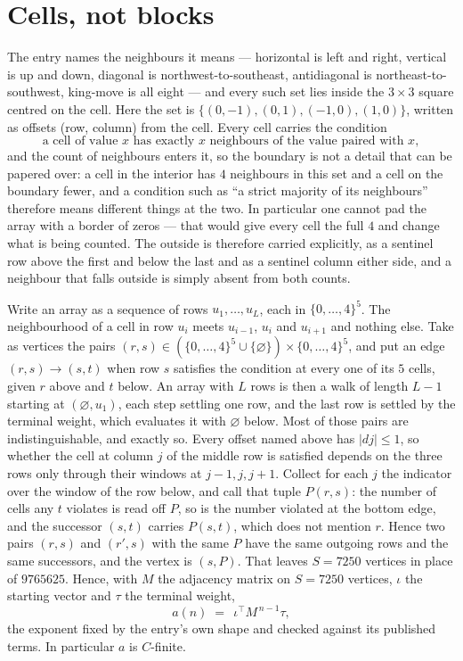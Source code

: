 \documentclass[11pt,a4paper]{article}
\theoremstyle{plain}
\theoremstyle{definition}
\begin{document}
\section{Cells, not blocks}

The entry names the neighbours it means --- horizontal is left and right, vertical is up and
down, diagonal is northwest-to-southeast, antidiagonal is northeast-to-southwest, king-move is
all eight --- and every such set lies inside the $3\times3$ square centred on the cell. Here
the set is $\{(0,-1), (0,1), (-1,0), (1,0)\}$, written as offsets (row, column) from the cell. Every cell carries
the condition
\[
\text{a cell of value }x\text{ has exactly }x\text{ neighbours of the value paired with }x,
\]
and the count of neighbours enters it, so the boundary is not a detail that can be papered
over: a cell in the interior has $4$ neighbours in this set and a cell on the boundary
fewer, and a condition such as ``a strict majority of its neighbours'' therefore means
different things at the two. In particular one cannot pad the array with a border of zeros ---
that would give every cell the full $4$ and change what is being counted. The outside is
therefore carried
explicitly, as a sentinel row above the first and below the last and as a sentinel column
either side, and a neighbour that falls outside is simply absent from both counts.

Write an array as a sequence of rows $u_1,\dots,u_L$, each in
$\{0,\dots,4\}^{5}$. The neighbourhood of a cell in row $u_i$ meets $u_{i-1}$,
$u_i$ and $u_{i+1}$ and nothing else. Take as vertices the pairs
$(r,s)\in(\{0,\dots,4\}^{5}\cup\{\varnothing\})\times\{0,\dots,4\}^{5}$,
and put an edge $(r,s)\to(s,t)$ when row $s$ satisfies the condition at every one of its
$5$ cells, given $r$ above and $t$ below. An array with $L$ rows is then a walk of length
$L-1$ starting at $(\varnothing,u_1)$, each step settling one row, and the last row is
settled by the terminal weight, which evaluates it with $\varnothing$ below. Most of those pairs are indistinguishable, and exactly so. Every offset named above has $|dj|\le 1$, so whether the cell at column $j$ of the middle row is satisfied depends on the three rows only through their windows at $j-1,j,j+1$. Collect for each $j$ the indicator over the window of the row below, and call that tuple $P(r,s)$: the number of cells any $t$ violates is read off $P$, so is the number violated at the bottom edge, and the successor $(s,t)$ carries $P(s,t)$, which does not mention $r$. Hence two pairs $(r,s)$ and $(r',s)$ with the same $P$ have the same outgoing rows and the same successors, and the vertex is $(s,P)$. That leaves $S=7250$ vertices in place of $9765625$. Hence,
with $M$ the adjacency matrix on $S=7250$ vertices, $\iota$ the starting vector and $\tau$ the
terminal weight,
\[
a(n)\;=\;\,\iota^{\!\top}M^{\,n-1}\tau ,
\]
the exponent fixed by the entry's own shape and checked against its published terms. In
particular $a$ is $C$-finite.
\end{document}
